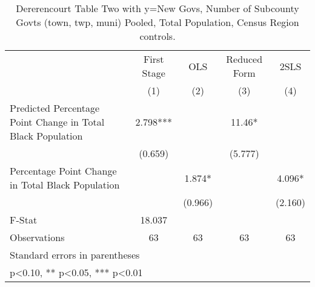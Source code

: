 \begin{table}[htbp]\centering
\def\sym#1{\ifmmode^{#1}\else\(^{#1}\)\fi}
\caption{Dererencourt Table Two with y=New Govs, Number of Subcounty Govts (town, twp, muni)  Pooled, Total Population, Census Region controls.}
\begin{tabular}{l*{4}{c}}
\toprule
                    & First Stage   &         OLS   &Reduced Form   &        2SLS   \\
                    &\multicolumn{1}{c}{(1)}   &\multicolumn{1}{c}{(2)}   &\multicolumn{1}{c}{(3)}   &\multicolumn{1}{c}{(4)}   \\
\midrule
Predicted Percentage Point Change in Total Black Population&       2.798***&               &       11.46*  &               \\
                    &     (0.659)   &               &     (5.777)   &               \\
\addlinespace
Percentage Point Change in Total Black Population&               &       1.874*  &               &       4.096*  \\
                    &               &     (0.966)   &               &     (2.160)   \\
\midrule
F-Stat              &      18.037   &               &               &               \\
Observations        &          63   &          63   &          63   &          63   \\
\bottomrule
\multicolumn{5}{l}{\footnotesize Standard errors in parentheses}\\
\multicolumn{5}{l}{\footnotesize * p<0.10, ** p<0.05, *** p<0.01}\\
\end{tabular}
\end{table}
